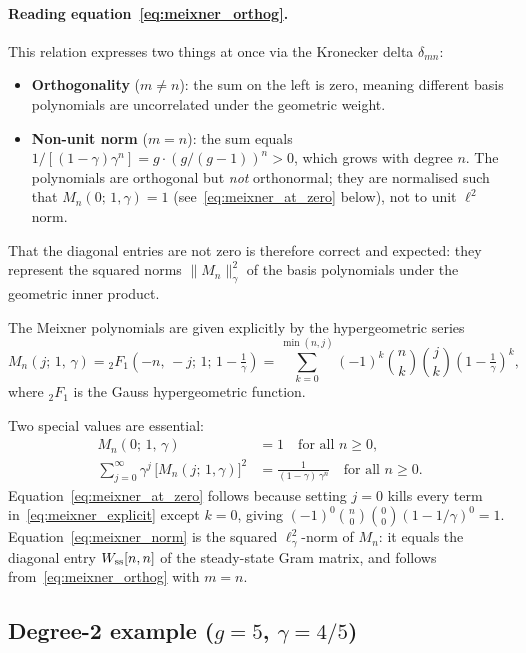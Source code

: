 \documentclass[11pt, a4paper]{article}
\theoremstyle{definition}
\begin{document}
\paragraph{Reading equation~\eqref{eq:meixner_orthog}.}
This relation expresses two things at once via the Kronecker delta $\delta_{mn}$:
\begin{itemize}
  \item \textbf{Orthogonality} ($m \neq n$): the sum on the left is zero,
    meaning different basis polynomials are uncorrelated under the
    geometric weight.
  \item \textbf{Non-unit norm} ($m = n$): the sum equals
    $1/[(1-\gamma)\gamma^n] = g\cdot(g/(g-1))^n > 0$, which grows
    with degree $n$.  The polynomials are orthogonal but \emph{not}
    orthonormal; they are normalised such that $M_n(0;\,1,\gamma) = 1$
    (see~\eqref{eq:meixner_at_zero} below), not to unit $\ell^2$ norm.
\end{itemize}
That the diagonal entries are not zero is therefore correct and expected:
they represent the squared norms $\|M_n\|^2_{\gamma}$ of the basis
polynomials under the geometric inner product.

\medskip
The Meixner polynomials are given explicitly by the hypergeometric series
\begin{equation}
  M_n(j;\, 1,\, \gamma) = {}_2F_1\!\left(-n,\, -j;\, 1;\, 1-\tfrac{1}{\gamma}\right)
  = \sum_{k=0}^{\min(n,j)} (-1)^k \binom{n}{k}\binom{j}{k}\left(1-\tfrac{1}{\gamma}\right)^{\!k},
  \label{eq:meixner_explicit}
\end{equation}
where ${}_2F_1$ is the Gauss hypergeometric function.

Two special values are essential:
\begin{align}
  M_n(0;\, 1,\, \gamma) &= 1 \quad\text{for all }n \geq 0,
    \label{eq:meixner_at_zero}\\[4pt]
  \sum_{j=0}^{\infty} \gamma^j\,\bigl[M_n(j;\,1,\gamma)\bigr]^2
    &= \frac{1}{(1-\gamma)\,\gamma^n} \quad\text{for all }n \geq 0.
    \label{eq:meixner_norm}
\end{align}
Equation~\eqref{eq:meixner_at_zero} follows because setting $j=0$ kills every
term in~\eqref{eq:meixner_explicit} except $k=0$, giving
$(-1)^0\binom{n}{0}\binom{0}{0}(1-1/\gamma)^0=1$.
Equation~\eqref{eq:meixner_norm} is the squared $\ell^2_\gamma$-norm of $M_n$:
it equals the diagonal entry $W_{\rm ss}[n,n]$ of the steady-state Gram
matrix, and follows from~\eqref{eq:meixner_orthog} with $m=n$.

\subsection{Degree-2 example ($g=5$, $\gamma=4/5$)}
\end{document}
